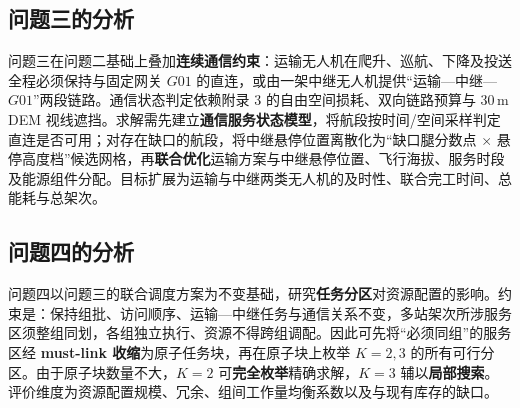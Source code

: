 \subsection{问题三的分析}

问题三在问题二基础上叠加\textbf{连续通信约束}：运输无人机在爬升、巡航、下降及投送全程必须保持与固定网关 $G01$ 的直连，或由一架中继无人机提供“运输—中继—$G01$”两段链路。通信状态判定依赖附录 3 的自由空间损耗、双向链路预算与 $30\,$m DEM 视线遮挡。求解需先建立\textbf{通信服务状态模型}，将航段按时间/空间采样判定直连是否可用；对存在缺口的航段，将中继悬停位置离散化为“缺口腿分数点 $\times$ 悬停高度档”候选网格，再\textbf{联合优化}运输方案与中继悬停位置、飞行海拔、服务时段及能源组件分配。目标扩展为运输与中继两类无人机的及时性、联合完工时间、总能耗与总架次。

\subsection{问题四的分析}

问题四以问题三的联合调度方案为不变基础，研究\textbf{任务分区}对资源配置的影响。约束是：保持组批、访问顺序、运输—中继任务与通信关系不变，多站架次所涉服务区须整组同划，各组独立执行、资源不得跨组调配。因此可先将“必须同组”的服务区经 \textbf{must-link 收缩}为原子任务块，再在原子块上枚举 $K=2,3$ 的所有可行分区。由于原子块数量不大，$K=2$ 可\textbf{完全枚举}精确求解，$K=3$ 辅以\textbf{局部搜索}。评价维度为资源配置规模、冗余、组间工作量均衡系数以及与现有库存的缺口。
